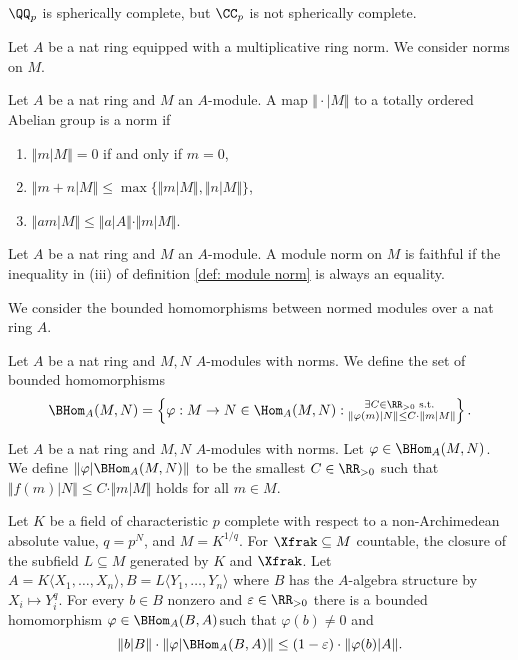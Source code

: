 \begin{example}
    $\QQ_{p}$ is spherically complete, but $\CC_{p}$ is not spherically complete. 
\end{example}
Let $A$ be a nat ring  equipped with a multiplicative ring norm. We consider norms on $M$.
\begin{definition}\label{def: module norm}
    Let $A$ be a nat ring and $M$ an $A$-module. A map $\Vert\cdot|M\Vert$ to a totally ordered Abelian group is a norm if
\begin{enumerate}[label=(\roman*)]
\item $\Vert m|M\Vert = 0$ if and only if $m=0$,
\item $\Vert m+n|M\Vert \le \max\{\Vert m|M\Vert, \Vert n|M\Vert\}$,
\item $\Vert am|M\Vert\leq\Vert a|A\Vert\cdot\Vert m|M\Vert$.
\end{enumerate}
\end{definition}
\begin{definition}\label{def: faithful module norm}
    Let $A$ be a nat ring and $M$ an $A$-module. A module norm on $M$ is 
    faithful if the inequality in (iii) of definition \ref{def: module norm}
    is always an equality.
\end{definition}
We consider the bounded homomorphisms between normed modules over a nat ring $A$. 
\begin{definition}\label{def: bounded module homomorphisms}
    Let $A$ be a nat ring and $M,N$ $A$-modules with norms. We define the set of bounded homomorphisms 
    \begin{equation}\label{eqn: def of BHom}
        \BHom_{A}(M,N)=\left\{\varphi:M\to N\in\Hom_{A}(M,N):\substack{\exists C\in\RR_{>0}\text{ s.t. }\\ \Vert \varphi(m)|N\Vert\leq C\cdot\Vert m|M\Vert}\right\}.
    \end{equation}
\end{definition}
\begin{definition}\label{def: norm of Homomorphism}
    Let $A$ be a nat ring and $M,N$ $A$-modules with norms. Let $\varphi\in\BHom_{A}(M,N)$. We define $\Vert\varphi|\BHom_{A}(M,N)\Vert$ to be the smallest $C\in\RR_{>0}$ such that $\Vert f(m)|N\Vert\leq C\cdot\Vert m|M\Vert$ holds for all $m\in M$. 
\end{definition}
\begin{lemma}\label{lem: p-power roots}
    Let $K$ be a field of characteristic $p$ complete with respect to a non-Archimedean absolute value, $q=p^{N}$, and $M=K^{1/q}$. For $\Xfrak\subseteq M$ countable, the closure of the subfield $L\subseteq M$ generated by $K$ and $\Xfrak$. Let $A=K\langle X_{1},\dots,X_{n}\rangle, B=L\langle Y_{1},\dots,Y_{n}\rangle$ where $B$ has the $A$-algebra structure by $X_{i}\mapsto Y_{i}^{q}$. For every $b\in B$ nonzero and $\varepsilon\in\RR_{>0}$ there is a bounded homomorphism $\varphi\in\BHom_{A}(B,A)$such that $\varphi(b)\neq0$ and 
    $$\Vert b|B\Vert\cdot\Vert\varphi|\BHom_{A}(B,A)\Vert\leq(1-\varepsilon)\cdot\Vert\varphi(b)|A\Vert.$$
\end{lemma}
